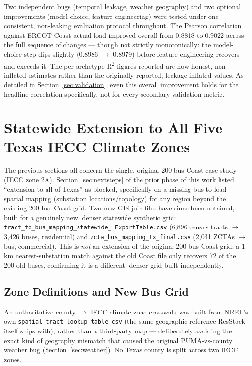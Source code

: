 \documentclass[11pt]{article}
\begin{document}
Two independent bugs (temporal leakage, weather geography) and two optional
improvements (model choice, feature engineering) were tested under one consistent,
non-leaking evaluation protocol throughout. The Pearson correlation against ERCOT
Coast actual load improved overall from 0.8818 to 0.9022 across the full sequence of
changes --- though not strictly monotonically: the model-choice step dips slightly
(0.8986 $\rightarrow$ 0.8979) before feature engineering recovers and exceeds it. The
per-archetype R\textsuperscript{2} figures reported are
now honest, non-inflated estimates rather than the originally-reported,
leakage-inflated values. As detailed in Section~\ref{sec:validation}, even this
overall improvement holds for the headline correlation specifically, not for every
secondary validation metric.

\section{Statewide Extension to All Five Texas IECC Climate Zones}
\label{sec:statewide}

The previous sections all concern the single, original 200-bus Coast case study (IECC
zone 2A). Section~\ref{sec:nextsteps} of the prior phase of this work listed
``extension to all of Texas'' as blocked, specifically on a missing bus-to-load spatial
mapping (substation locations/topology) for any region beyond the existing 200-bus
Coast grid. Two new GIS join files have since been obtained, built for a genuinely
new, denser statewide synthetic grid: \texttt{tract\_to\_bus\_mapping\_statewide\_%
ExportTable.csv} (6{,}896 census tracts $\rightarrow$ 3{,}426 buses, residential) and
\texttt{zcta\_bus\_mapping\_tx\_final.csv} (2{,}031 ZCTAs $\rightarrow$ bus, commercial).
This is \emph{not} an extension of the original 200-bus Coast grid: a 1\,km
nearest-substation match against the old Coast file only recovers 72 of the 200 old
buses, confirming it is a different, denser grid built independently.

\subsection{Zone Definitions and New Bus Grid}

An authoritative county $\rightarrow$ IECC climate-zone crosswalk was built from NREL's
own \texttt{spatial\_tract\_lookup\_table.csv} (the same geographic reference ResStock
itself ships with), rather than a third-party map --- deliberately avoiding the exact
kind of geography mismatch that caused the original PUMA-vs-county weather bug
(Section~\ref{sec:weather}). No Texas county is split across two IECC zones.
\end{document}
